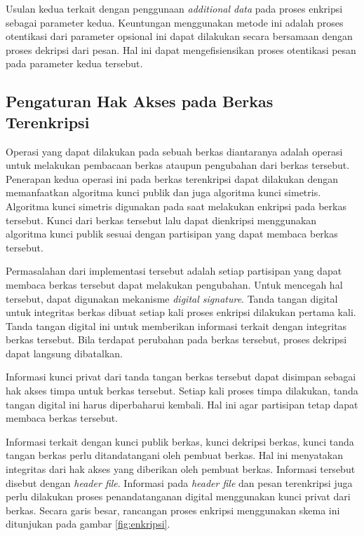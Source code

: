 \documentclass[conference]{IEEEtran}
\begin{document}
Usulan kedua terkait dengan penggunaan \emph{additional data} pada proses enkripsi sebagai parameter kedua. Keuntungan menggunakan metode ini adalah proses otentikasi dari parameter opsional ini dapat dilakukan secara bersamaan dengan proses dekripsi dari pesan. Hal ini dapat mengefisiensikan proses otentikasi pesan pada parameter kedua tersebut.

\subsection{Pengaturan Hak Akses pada Berkas Terenkripsi}
\label{sec:hak-akses}

Operasi yang dapat dilakukan pada sebuah berkas diantaranya adalah operasi untuk melakukan pembacaan berkas ataupun pengubahan dari berkas tersebut. Penerapan kedua operasi ini pada berkas terenkripsi dapat dilakukan dengan memanfaatkan algoritma kunci publik dan juga algoritma kunci simetris. Algoritma kunci simetris digunakan pada saat melakukan enkripsi pada berkas tersebut. Kunci dari berkas tersebut lalu dapat dienkripsi menggunakan algoritma kunci publik sesuai dengan partisipan yang dapat membaca berkas tersebut. 

Permasalahan dari implementasi tersebut adalah setiap partisipan yang dapat membaca berkas tersebut dapat melakukan pengubahan. Untuk mencegah hal tersebut, dapat digunakan mekanisme \emph{digital signature}. Tanda tangan digital untuk integritas berkas dibuat setiap kali proses enkripsi dilakukan pertama kali. Tanda tangan digital ini untuk memberikan informasi terkait dengan integritas berkas tersebut. Bila terdapat perubahan pada berkas tersebut, proses dekripsi dapat langsung dibatalkan.

Informasi kunci privat dari tanda tangan berkas tersebut dapat disimpan sebagai hak akses timpa untuk berkas tersebut. Setiap kali proses timpa dilakukan, tanda tangan digital ini harus diperbaharui kembali. Hal ini agar partisipan tetap dapat membaca berkas tersebut.

Informasi terkait dengan kunci publik berkas, kunci dekripsi berkas, kunci tanda tangan berkas perlu ditandatangani oleh pembuat berkas. Hal ini menyatakan integritas dari hak akses yang diberikan oleh pembuat berkas. Informasi tersebut disebut dengan \emph{header file}. Informasi pada \emph{header file} dan pesan terenkripsi juga perlu dilakukan proses penandatanganan digital menggunakan kunci privat dari berkas. Secara garis besar, rancangan proses enkripsi menggunakan skema ini ditunjukan pada gambar \ref{fig:enkripsi}.
\end{document}
